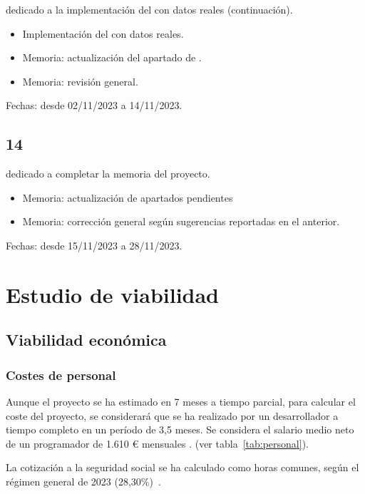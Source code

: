  dedicado a la implementación del  con datos reales (continuación). 

\begin{itemize}
	\item Implementación del  con datos reales. 
	\item Memoria: actualización del apartado de . 
	\item Memoria: revisión general. 
\end{itemize}

Fechas: desde 02/11/2023 a 14/11/2023.

\subsection{ 14}

 dedicado a completar la memoria del proyecto. 

\begin{itemize}
	\item Memoria: actualización de apartados pendientes
	\item Memoria: corrección general según sugerencias reportadas en el  anterior. 
\end{itemize}

Fechas: desde 15/11/2023 a 28/11/2023.

\newpage
\section{Estudio de viabilidad}

\subsection{Viabilidad económica}
\subsubsection{Costes de personal}
Aunque el proyecto se ha estimado en 7 meses a tiempo parcial, para calcular el coste del proyecto, se 
considerará que se ha realizado por un desarrollador a tiempo completo en un período de 3,5 meses. 
Se considera el salario medio neto de un programador de 1.610 € mensuales \cite{salario}.
(ver tabla~\ref{tab:personal}).

La cotización a la seguridad social se ha calculado como horas comunes, según
el régimen general de 2023 (28,30\%)~\cite{seguridad-social}.

